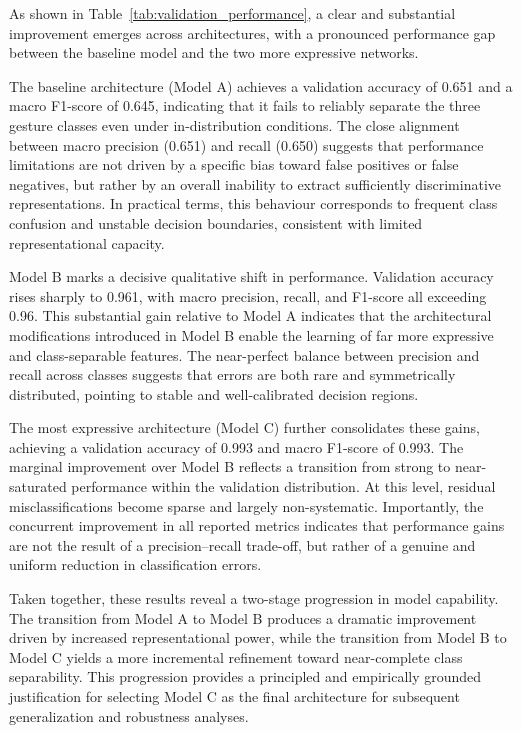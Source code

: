 \documentclass{article}
\begin{document}
As shown in Table~\ref{tab:validation_performance}, a clear and substantial 
improvement emerges across architectures, with a pronounced performance gap 
between the baseline model and the two more expressive networks.

The baseline architecture (Model A) achieves a validation accuracy of 0.651 
and a macro F1-score of 0.645, indicating that it fails to reliably separate 
the three gesture classes even under in-distribution conditions. The close 
alignment between macro precision (0.651) and recall (0.650) suggests that 
performance limitations are not driven by a specific bias toward false positives 
or false negatives, but rather by an overall inability to extract sufficiently 
discriminative representations. In practical terms, this behaviour corresponds 
to frequent class confusion and unstable decision boundaries, consistent with 
limited representational capacity.

Model B marks a decisive qualitative shift in performance. Validation accuracy 
rises sharply to 0.961, with macro precision, recall, and F1-score all exceeding 
0.96. This substantial gain relative to Model A indicates that the architectural 
modifications introduced in Model B enable the learning of far more expressive 
and class-separable features. The near-perfect balance between precision and 
recall across classes suggests that errors are both rare and symmetrically 
distributed, pointing to stable and well-calibrated decision regions.

The most expressive architecture (Model C) further consolidates these gains, 
achieving a validation accuracy of 0.993 and macro F1-score of 0.993. The 
marginal improvement over Model B reflects a transition from strong to 
near-saturated performance within the validation distribution. At this 
level, residual misclassifications become sparse and largely non-systematic. 
Importantly, the concurrent improvement in all reported metrics indicates 
that performance gains are not the result of a precision–recall trade-off, 
but rather of a genuine and uniform reduction in classification errors.

Taken together, these results reveal a two-stage progression in model 
capability. The transition from Model A to Model B produces a dramatic 
improvement driven by increased representational power, while the 
transition from Model B to Model C yields a more incremental refinement 
toward near-complete class separability. This progression provides a 
principled and empirically grounded justification for selecting Model C 
as the final architecture for subsequent generalization and robustness 
analyses.
\end{document}
